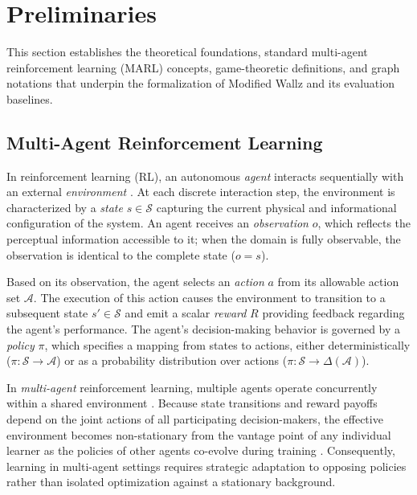 \documentclass{article}
\begin{document}
\section{Preliminaries}
\label{sec:preliminaries}

This section establishes the theoretical foundations, standard multi-agent reinforcement learning (MARL) concepts, game-theoretic definitions, and graph notations that underpin the formalization of Modified Wallz and its evaluation baselines.

\subsection{Multi-Agent Reinforcement Learning}
\label{subsec:prelim_marl}

In reinforcement learning (RL), an autonomous \emph{agent} interacts sequentially with an external \emph{environment} \cite{sutton2018reinforcement}. At each discrete interaction step, the environment is characterized by a \emph{state} $s \in \mathcal{S}$ capturing the current physical and informational configuration of the system. An agent receives an \emph{observation} $o$, which reflects the perceptual information accessible to it; when the domain is fully observable, the observation is identical to the complete state ($o = s$). 

Based on its observation, the agent selects an \emph{action} $a$ from its allowable action set $\mathcal{A}$. The execution of this action causes the environment to transition to a subsequent state $s' \in \mathcal{S}$ and emit a scalar \emph{reward} $R$ providing feedback regarding the agent's performance. The agent's decision-making behavior is governed by a \emph{policy} $\pi$, which specifies a mapping from states to actions, either deterministically ($\pi: \mathcal{S} \rightarrow \mathcal{A}$) or as a probability distribution over actions ($\pi: \mathcal{S} \rightarrow \Delta(\mathcal{A})$).

In \emph{multi-agent} reinforcement learning, multiple agents operate concurrently within a shared environment \cite{busoniu2008comprehensive}. Because state transitions and reward payoffs depend on the joint actions of all participating decision-makers, the effective environment becomes non-stationary from the vantage point of any individual learner as the policies of other agents co-evolve during training \cite{gronauer2022multiagent,zhang2020multiagent}. Consequently, learning in multi-agent settings requires strategic adaptation to opposing policies rather than isolated optimization against a stationary background.
\end{document}
